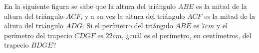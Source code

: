 En la siguiente figura se sabe que la altura del triángulo $ABE$ es la mitad de la altura del triángulo $ACF$, y a su vez la altura del triángulo $ACF$ es la mitad de la altura del triángulo $ADG$. Si el perímetro del triángulo $ABE$ es $7cm$ y el perímetro del trapecio $CDGF$ es $22cm$, ¿cuál es el perímetro, en centímetros, del trapecio $BDGE$?